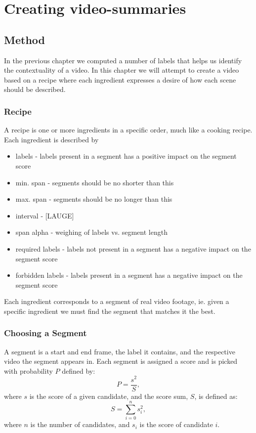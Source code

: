 %
\chapter{Creating video-summaries}
%
\section{Method}
%
In the previous chapter we computed a number of labels that helps us identify the contextuality of a video. In this chapter we will attempt to create a video based on a recipe where each ingredient expresses a desire of how each scene should be described.
%
\subsection{Recipe}
%
A recipe is one or more ingredients in a specific order, much like a cooking recipe. Each ingredient is described by
%
\begin{itemize}
\item labels - labels present in a segment has a positive impact on the segment score
\item min. span - segments should be no shorter than this
\item max. span - segments should be no longer than this
\item interval - [LAUGE]
\item span alpha - weighing of labels vs. segment length
\item required labels - labels not present in a segment has a negative impact on the segment score
\item forbidden labels - labels present in a segment has a negative impact on the segment score
\end{itemize}
%
Each ingredient corresponds to a segment of real video footage, ie. given a specific ingredient we must find the segment that matches it the best.
%
\subsection{Choosing a Segment}
%
A segment is a start and end frame, the label it contains, and the respective video the segment appears in. Each segment is assigned a score and is picked with probability $P$ defined by: 
%
\[
P = \frac{s^2}{S},
\]
%
where $s$ is the score of a given candidate, and the score sum, $S$, is defined as:
%
\[
S = \sum_{i=0}^{n} s_{i}^2,
\]
%
where $n$ is the number of candidates, and $s_i$ is the score of candidate $i$.
%
